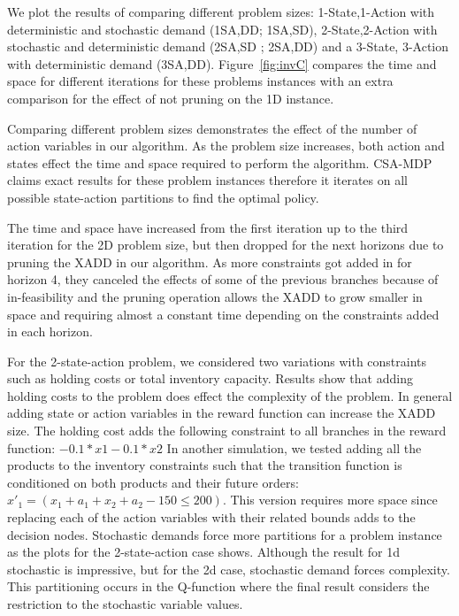 We plot the results of comparing different \InventoryControl problem sizes: 1-State,1-Action with deterministic and stochastic demand (1SA,DD; 1SA,SD), 2-State,2-Action with stochastic and deterministic demand (2SA,SD ; 2SA,DD) and a 3-State, 3-Action with deterministic demand (3SA,DD). Figure~\ref{fig:invC} compares the time and space
for different iterations for these problems instances with an extra
comparison for the effect of not pruning on the 1D instance. 

Comparing different problem sizes demonstrates the effect of the number of action variables in our algorithm. As the problem size increases, both action and states effect the time and space required to perform the algorithm. CSA-MDP claims exact results for these problem instances therefore it iterates on all possible state-action partitions to find the optimal policy. 

The time and space have increased from the first iteration up to the third
iteration for the 2D problem size, but then dropped for the next horizons
due to pruning the XADD in our algorithm. As more constraints got added in
for horizon 4, they canceled the effects of some of the previous branches
because of in-feasibility and the pruning operation allows the XADD to grow
smaller in space and requiring almost a constant time depending on the
constraints added in each horizon.

For the 2-state-action problem, we considered two variations with constraints such as holding costs or total inventory capacity. Results show that adding holding costs to the problem does effect the complexity of the problem. In general adding state or action variables in the reward function can increase the XADD size. The holding cost adds the following constraint to all branches in the reward function: 
$ -0.1*x1 -0.1*x2 $
In another simulation, we tested adding all the products to the inventory constraints such that the transition function is conditioned on both products and their future orders:  $x'_1 = (x_1 + a_1 + x_2 +a_2 - 150 \leq 200) $. This version requires more space since replacing each of the action variables with their related bounds adds to the decision nodes.
Stochastic demands force more partitions for a problem instance as the plots for the 2-state-action case shows. Although the result for 1d stochastic is impressive, but for the 2d case, stochastic demand forces complexity. This partitioning occurs in the Q-function where the final result considers the restriction to the stochastic variable values. 

